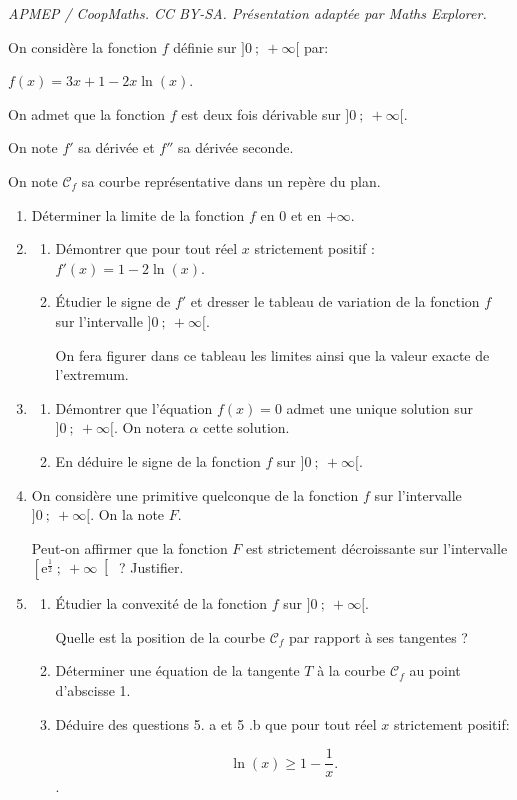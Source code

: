 \documentclass[10pt]{article}
\providecommand{\e}{{\mathrm{e}}}
\begin{document}
\noindent\textit{APMEP / CoopMaths. CC BY-SA. Présentation adaptée par Maths Explorer.}\par\medskip
\medskip

On considère la fonction $f$ définie sur $]0~;~+\infty[$ par:
\begin{center}\boldmath $f(x) = 3x + 1 - 2x \ln (x)$.\unboldmath\end{center}

On admet que la fonction $f$ est deux fois dérivable sur $]0~;~+\infty[$. 

On note $f'$ sa dérivée et $f''$ sa dérivée seconde.

On note $\mathcal{C}_f$ sa courbe représentative dans un repère du plan.

\medskip

\begin{enumerate}
\item Déterminer la limite de la fonction $f$ en 0 et en $+\infty$.
\item 
	\begin{enumerate}
		\item Démontrer que pour tout réel $x$ strictement positif : $f'(x) = 1- 2\ln (x)$.
		\item Étudier le signe de $f'$ et dresser le tableau de variation de la fonction $f$ sur l'intervalle $]0~;~+\infty[$.
		
On fera figurer dans ce tableau les limites ainsi que la valeur exacte de l'extremum.
	\end{enumerate}	
\item
	\begin{enumerate}
		\item Démontrer que l'équation $f(x) = 0$ admet une unique solution sur $]0~;~+\infty[$. On notera $\alpha$ cette solution.
		\item En déduire le signe de la fonction $f$ sur $]0~;~+\infty[$.
	\end{enumerate}	
\item On considère une primitive quelconque de la fonction $f$ sur
l'intervalle $]0~;~+\infty[$. On la note $F$.

Peut-on affirmer que la fonction $F$ est strictement décroissante sur l'intervalle $\left[\e^{\frac12}~;~+ \infty\right[$ ? Justifier.
\item
	\begin{enumerate}
		\item Étudier la convexité de la fonction $f$ sur $]0~;~+\infty[$.
		
Quelle est la position de la courbe $\mathcal{C}_f$ par rapport à ses tangentes ?
		\item Déterminer une équation de la tangente $T$ à la courbe $\mathcal{C}_f$ au point d'abscisse 1.
		\item Déduire des questions 5. a et 5 .b que pour tout réel $x$ strictement positif:

\[\ln (x) \geqslant  1 - \dfrac 1x.\].
	\end{enumerate}
\end{enumerate}

\bigskip
\end{document}

